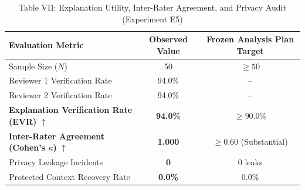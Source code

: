 \begin{table}[t]
\centering
\caption{Table VII: Explanation Utility, Inter-Rater Agreement, and Privacy Audit (Experiment E5)}
\begin{tabular}{l c c}
\hline
\textbf{Evaluation Metric} & \textbf{Observed Value} & \textbf{Frozen Analysis Plan Target} \\
\hline
Sample Size ($N$) & 50 & $\ge 50$ \\
Reviewer 1 Verification Rate & 94.0\% & -- \\
Reviewer 2 Verification Rate & 94.0\% & -- \\
\textbf{Explanation Verification Rate (EVR)} $\uparrow$ & \textbf{94.0\%} & $\ge 90.0\%$ \\
\textbf{Inter-Rater Agreement (Cohen's $\kappa$)} $\uparrow$ & \textbf{1.000} & $\ge 0.60$ (Substantial) \\
Privacy Leakage Incidents & \textbf{0} & $0$ leaks \\
Protected Context Recovery Rate & \textbf{0.0\%} & $0.0\%$ \\
\hline
\end{tabular}
\end{table}
